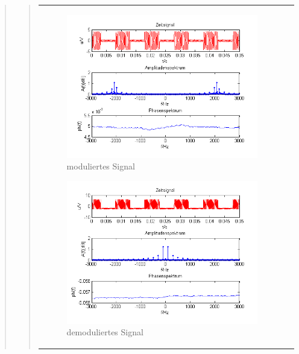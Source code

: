 \begin{quote}
\begin{quote}
\begin{center}
\begin{tabular}{ll}
\begin{minipage}{0.67\textwidth}
                \begin{figure}[H]
                    \includegraphics[scale=0.7]{Bilder/Am_Rec_2k_100Hz_mo}
                    \caption{moduliertes Signal}
                    \label{fig:DemorechteckoT}
                \end{figure}
        
            \end{minipage}
        
            \begin{minipage}{0.67\textwidth}
                \begin{figure}[H]
                    \includegraphics[scale=0.7]{Bilder/Demo_Rec_2k_100Hz_mo_ohneTiefpass}
                    \caption{demoduliertes Signal}
                    \label{fig:DemorechteckoT2}
                \end{figure}
        

\end{minipage}
\end{tabular}
\end{center}
\end{quote}
\end{quote}
